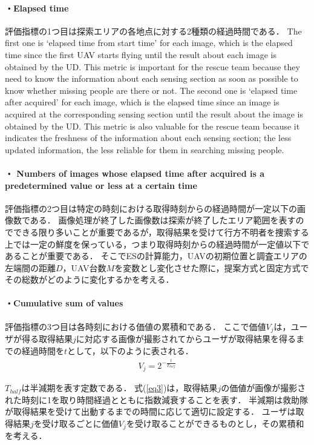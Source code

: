 \documentclass{ieeeaccess}
\begin{document}
\paragraph*{・Elapsed time}
評価指標の1つ目は探索エリアの各地点に対する2種類の経過時間である．
The first one is `elapsed time from start time' for each image, which is the elapsed time since the first UAV starts flying until the result about each image is obtained by the UD.
%
This metric is important for the rescue team because they need to know the information about each sensing section as soon as possible to know whether missing people are there or not.
%
The second one is `elapsed time after acquired' for each image, which is the elapsed time since an image is acquired at the corresponding sensing section until the result about the image is obtained by the UD.
%
This metric is also valuable for the rescue team because it indicates the freshness of the information about each sensing section; the less updated information, the less reliable for them in searching missing people.

\paragraph*{・ Numbers of images whose elapsed time after acquired is a predetermined value or less at a certain time}
評価指標の2つ目は特定の時刻における取得時刻からの経過時間が一定以下の画像数である．
画像処理が終了した画像数は探索が終了したエリア範囲を表すのでできる限り多いことが重要であるが，取得結果を受けて行方不明者を捜索する上では一定の鮮度を保っている，つまり取得時刻からの経過時間が一定値以下であることが重要である．
そこでESの計算能力，UAVの初期位置と調査エリアの左端間の距離$D$，UAV台数$M$を変数とし変化させた際に，提案方式と固定方式でその総数がどのように変化するかを考える．

\paragraph*{・Cumulative sum of values}
評価指標の3つ目は各時刻における価値の累積和である．
ここで価値$V_j$は，ユーザが得る取得結果$j$に対応する画像が撮影されてからユーザが取得結果を得るまでの経過時間を$t$として，以下のように表される\cite{NOMURA2001}．
\begin{align}
V_j=2^{-\frac{t}{T_{half}}} \label{eq3}
\end{align}

$T_{half}$は半減期を表す定数である．
式(\ref{eq3})は，取得結果$j$の価値が画像が撮影された時刻に1を取り時間経過とともに指数減衰することを表す．
半減期は救助隊が取得結果を受けて出動するまでの時間に応じて適切に設定する．
ユーザは取得結果$j$を受け取るごとに価値$V_j$を受け取ることができるものとし，その累積和を考える．
\end{document}
